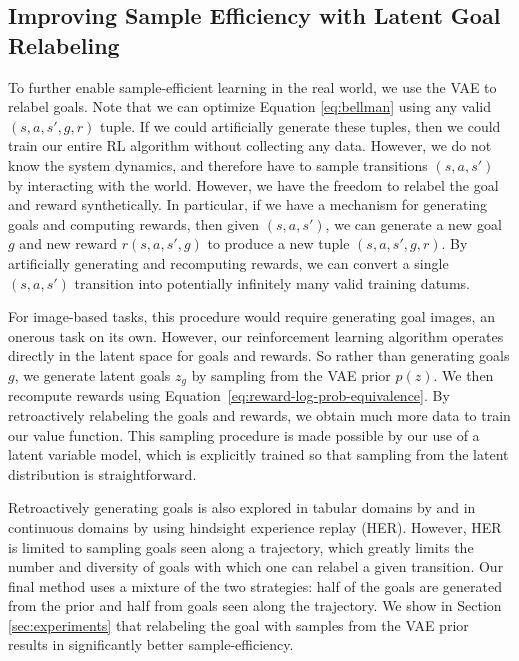 \documentclass{article}
\begin{document}
\subsection{Improving Sample Efficiency with Latent Goal Relabeling}\label{sec:goal-relabeling}
To further enable sample-efficient learning in the real world, we use the VAE to relabel goals.
Note that we can optimize Equation \eqref{eq:bellman} using any valid $(s, a, s', g, r)$ tuple.
If we could artificially generate these tuples, then we could train our entire RL algorithm without collecting any data.
However, we do not know the system dynamics, and therefore have to sample transitions $(s,a,s')$ by interacting with the world.
However, we have the freedom to relabel the goal and reward synthetically.
In particular, if we have a mechanism for generating goals and computing rewards, then given $(s, a, s')$, we can generate a new goal $g$ and new reward $r(s, a, s', g)$ to produce a new tuple $(s, a, s', g, r)$.
By artificially generating and recomputing rewards, we can convert a single $(s, a, s')$ transition into potentially infinitely many valid training datums.

For image-based tasks, this procedure would require generating goal images, an onerous task on its own.
However, our reinforcement learning algorithm operates directly in the latent space for goals and rewards.
So rather than generating goals $g$, we generate latent goals $z_g$ by sampling from the VAE prior $p(z)$.
We then recompute rewards using Equation~\eqref{eq:reward-log-prob-equivalence}.
By retroactively relabeling the goals and rewards, we obtain much more data to train our value function.
This sampling procedure is made possible by our use of a latent variable model, which is explicitly trained so that sampling from the latent distribution is straightforward.

Retroactively generating goals is also explored in tabular domains by \citet{kaelbling1993goals} and in continuous domains by \citet{andrychowicz2017her} using hindsight experience replay (HER).
However, HER is limited to sampling goals seen along a trajectory, which greatly limits the number and diversity of goals with which one can relabel a given transition.
Our final method uses a mixture of the two strategies: half of the goals are generated from the prior and half from goals seen along the trajectory.
We show in Section \ref{sec:experiments} that relabeling the goal with samples from the VAE prior results in significantly better sample-efficiency.
\end{document}
